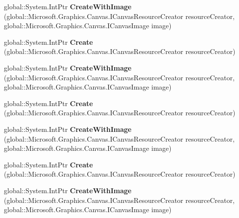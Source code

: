 \begin{DoxyCompactItemize}
global\+::\+System.\+Int\+Ptr {\bfseries Create\+With\+Image} (global\+::\+Microsoft.\+Graphics.\+Canvas.\+I\+Canvas\+Resource\+Creator resource\+Creator, global\+::\+Microsoft.\+Graphics.\+Canvas.\+I\+Canvas\+Image image)
\item 
\mbox{\label{interface_microsoft_1_1_graphics_1_1_canvas_1_1_brushes_1_1_i_canvas_image_brush_factory_a0aafe7b51d14afc52a9f6afdccb1f678}} 
global\+::\+System.\+Int\+Ptr {\bfseries Create} (global\+::\+Microsoft.\+Graphics.\+Canvas.\+I\+Canvas\+Resource\+Creator resource\+Creator)
\item 
\mbox{\label{interface_microsoft_1_1_graphics_1_1_canvas_1_1_brushes_1_1_i_canvas_image_brush_factory_af53fd276e3f9152ed0f5424d6f168ecd}} 
global\+::\+System.\+Int\+Ptr {\bfseries Create\+With\+Image} (global\+::\+Microsoft.\+Graphics.\+Canvas.\+I\+Canvas\+Resource\+Creator resource\+Creator, global\+::\+Microsoft.\+Graphics.\+Canvas.\+I\+Canvas\+Image image)
\item 
\mbox{\label{interface_microsoft_1_1_graphics_1_1_canvas_1_1_brushes_1_1_i_canvas_image_brush_factory_a0aafe7b51d14afc52a9f6afdccb1f678}} 
global\+::\+System.\+Int\+Ptr {\bfseries Create} (global\+::\+Microsoft.\+Graphics.\+Canvas.\+I\+Canvas\+Resource\+Creator resource\+Creator)
\item 
\mbox{\label{interface_microsoft_1_1_graphics_1_1_canvas_1_1_brushes_1_1_i_canvas_image_brush_factory_af53fd276e3f9152ed0f5424d6f168ecd}} 
global\+::\+System.\+Int\+Ptr {\bfseries Create\+With\+Image} (global\+::\+Microsoft.\+Graphics.\+Canvas.\+I\+Canvas\+Resource\+Creator resource\+Creator, global\+::\+Microsoft.\+Graphics.\+Canvas.\+I\+Canvas\+Image image)
\item 
\mbox{\label{interface_microsoft_1_1_graphics_1_1_canvas_1_1_brushes_1_1_i_canvas_image_brush_factory_a0aafe7b51d14afc52a9f6afdccb1f678}} 
global\+::\+System.\+Int\+Ptr {\bfseries Create} (global\+::\+Microsoft.\+Graphics.\+Canvas.\+I\+Canvas\+Resource\+Creator resource\+Creator)
\item 
\mbox{\label{interface_microsoft_1_1_graphics_1_1_canvas_1_1_brushes_1_1_i_canvas_image_brush_factory_af53fd276e3f9152ed0f5424d6f168ecd}} 
global\+::\+System.\+Int\+Ptr {\bfseries Create\+With\+Image} (global\+::\+Microsoft.\+Graphics.\+Canvas.\+I\+Canvas\+Resource\+Creator resource\+Creator, global\+::\+Microsoft.\+Graphics.\+Canvas.\+I\+Canvas\+Image image)
\end{DoxyCompactItemize}


